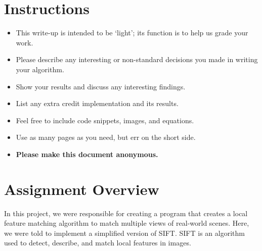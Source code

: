 \section*{Instructions}
\begin{itemize}
  \item This write-up is intended to be `light'; its function is to help us grade your work.
  \item Please describe any interesting or non-standard decisions you made in writing your algorithm.
  \item Show your results and discuss any interesting findings.
  \item List any extra credit implementation and its results.
  \item Feel free to include code snippets, images, and equations.
  \item Use as many pages as you need, but err on the short side.
  \item \textbf{Please make this document anonymous.}
\end{itemize}

\section*{Assignment Overview}
In this project, we were responsible for creating a program that creates a local feature matching algorithm to match multiple views of real-world scenes. Here, we were told to implement a simplified version of SIFT. SIFT is an algorithm used to detect, describe, and match local features in images.

